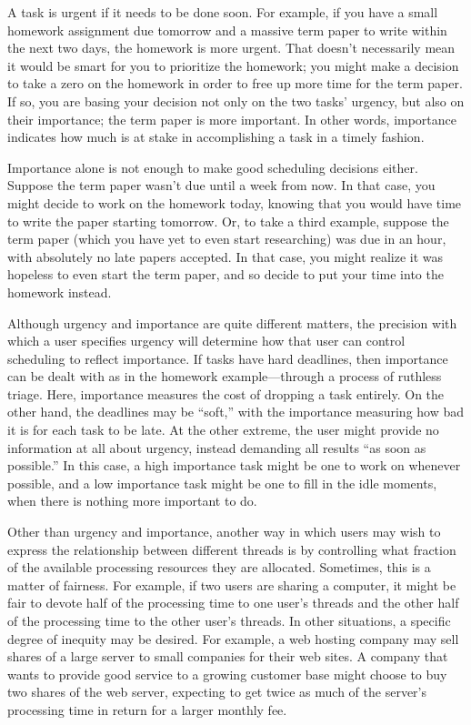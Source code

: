 A task is urgent if it needs to be done soon.  For example, if you
have a small homework assignment due tomorrow and a massive term
paper to write within the next two days, the homework is more urgent.
That doesn't necessarily mean it would be smart for you to prioritize
the homework; you might make a decision to take a zero on the homework
in order to free up more time for the term paper.  If so, you are
basing your decision not only on the two tasks' urgency, but also on
their importance; the term paper is more important.  In other words,
importance indicates how much is at stake in accomplishing a task in
a timely fashion.

Importance alone is not enough to make good scheduling decisions
either.  Suppose the term paper wasn't due until a week from now.  In
that case, you might decide to work on the homework today, knowing
that you would have time to write the paper starting tomorrow.  Or, to
take a third example, suppose the term paper (which you have yet to
even start researching) was due in an hour, with absolutely no late
papers accepted.  In that case, you might realize it was hopeless to
even start the term paper, and so decide to put your time into the
homework instead.

Although urgency and importance are quite different matters, the
precision with which a user specifies urgency will determine how that
user can control scheduling to reflect importance.  If tasks have
hard deadlines, then importance can be dealt with as in the
homework example---through a process of ruthless triage.  Here,
importance measures the cost of dropping a task entirely.  On the
other hand, the deadlines may be ``soft,'' with the importance
measuring how bad it is for each task to be late.  At the other
extreme, the user might provide no information at all about urgency,
instead demanding all results ``as soon as possible.''  In this case,
a high importance task might be one to work on whenever possible,
and a low importance task might be one to fill in the idle moments,
when there is nothing more important to do.

Other than urgency and importance, another way in which users may wish to express the relationship
between different threads is by controlling what fraction of the available
processing resources they are allocated.  Sometimes, this is a matter
of fairness.  For example, if two users are sharing a computer, it
might be fair to devote half of the processing time to one user's
threads and the other half of the processing time to the other user's
threads.  In other situations, a specific degree of inequity may be
desired.  For example, a web hosting company may
sell shares of a large server to small companies for their web sites.
A company that wants to provide good service to a growing customer
base might choose to buy two shares of the web server, expecting to
get twice as much of the server's processing time in return for a
larger monthly fee.

